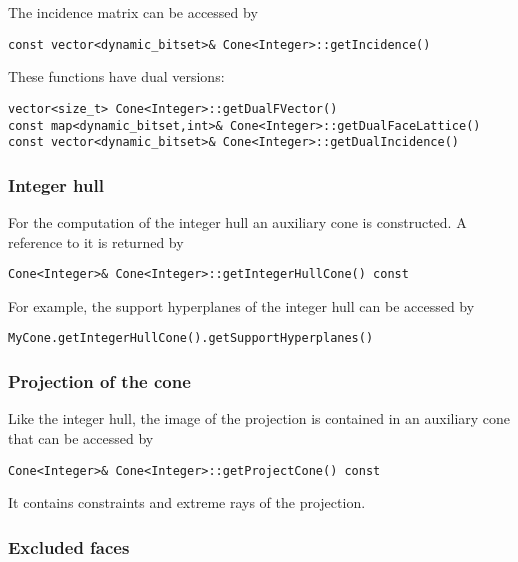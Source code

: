 \documentclass[12pt,a4paper]{scrartcl}
\theoremstyle{definition}
\begin{document}
\begin{small}
The incidence matrix can be accessed by

\begin{Verbatim}
const vector<dynamic_bitset>& Cone<Integer>::getIncidence()
\end{Verbatim}

These functions have dual versions:

\begin{Verbatim}
vector<size_t> Cone<Integer>::getDualFVector()
const map<dynamic_bitset,int>& Cone<Integer>::getDualFaceLattice()
const vector<dynamic_bitset>& Cone<Integer>::getDualIncidence()
\end{Verbatim}

\subsubsection{Integer hull}

For the computation of the integer hull an auxiliary cone is constructed. A reference to it is returned by
\begin{Verbatim}
Cone<Integer>& Cone<Integer>::getIntegerHullCone() const
\end{Verbatim}

For example, the support hyperplanes of the integer hull can be accessed by
\begin{Verbatim}
MyCone.getIntegerHullCone().getSupportHyperplanes()
\end{Verbatim}

\subsubsection{Projection of the cone}

Like the integer hull, the image of the projection is contained in an auxiliary cone that can be accessed by
\begin{Verbatim}
Cone<Integer>& Cone<Integer>::getProjectCone() const
\end{Verbatim}

It contains constraints and extreme rays of the projection.

\subsubsection{Excluded faces}


\end{small}
\end{document}

